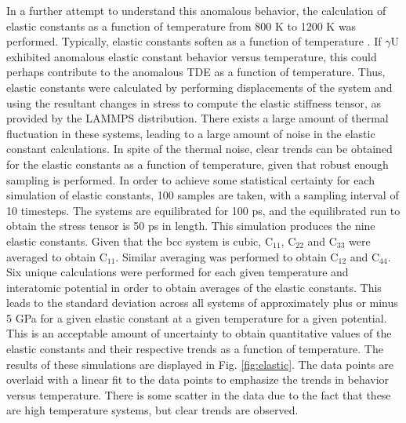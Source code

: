 \documentclass[review]{elsarticle}
\begin{document}
In a further attempt to understand this anomalous behavior, the calculation of elastic constants as a function of temperature from 800 K to 1200 K was performed. Typically, elastic constants soften as a function of temperature \cite{varshni1970}. If $\gamma$U exhibited anomalous elastic constant behavior versus temperature, this could perhaps contribute to the anomalous TDE as a function of temperature. Thus, elastic constants were calculated by performing displacements of the system and using the resultant changes in stress to compute the elastic stiffness tensor, as provided by the LAMMPS distribution. There exists a large amount of thermal fluctuation in these systems, leading to a large amount of noise in the elastic constant calculations. In spite of the thermal noise, clear trends can be obtained for the elastic constants as a function of temperature, given that robust enough sampling is performed. In order to achieve some statistical certainty for each simulation of elastic constants, 100 samples are taken, with a sampling interval of 10 timesteps. The systems are equilibrated for 100 ps, and the equilibrated run to obtain the stress tensor is 50 ps in length. This simulation produces the nine elastic constants. Given that the bcc system is cubic, C$_{11}$, C$_{22}$ and C$_{33}$ were averaged to obtain C$_{11}$. Similar averaging was performed to obtain C$_{12}$ and C$_{44}$. Six unique calculations were performed for each given temperature and interatomic potential in order to obtain averages of the elastic constants. This leads to the standard deviation across all systems of approximately plus or minus 5 GPa for a given elastic constant at a given temperature for a given potential. This is an acceptable amount of uncertainty to obtain quantitative values of the elastic constants and their respective trends as a function of temperature. The results of these simulations are displayed in Fig. \ref{fig:elastic}. The data points are overlaid with a linear fit to the data points to emphasize the trends in behavior versus temperature. There is some scatter in the data due to the fact that these are high temperature systems, but clear trends are observed. 
\end{document}

